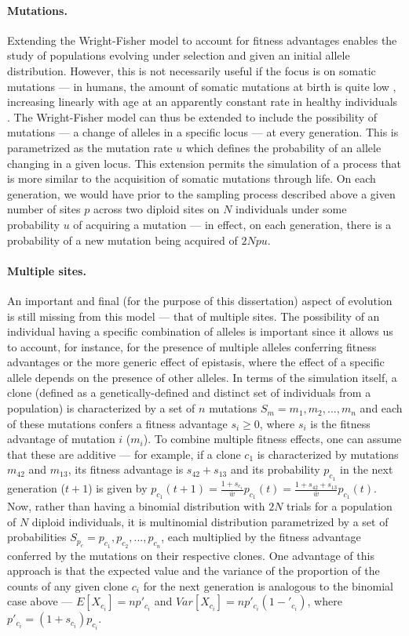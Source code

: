 \paragraph{Mutations.} Extending the Wright-Fisher model to account for fitness advantages enables the study of populations evolving under selection and given an initial allele distribution. However, this is not necessarily useful if the focus is on somatic mutations --- in humans, the amount of somatic mutations at birth is quite low \cite{SpencerChapman_2021_gjz4x4,Mitchell2021-zl}, increasing linearly with age at an apparently constant rate in healthy individuals \cite{Abascal_2021_gjvqfm,Mitchell2021-zl}. The Wright-Fisher model can thus be extended to include the possibility of mutations --- a change of alleles in a specific locus --- at every generation. This is parametrized as the mutation rate $u$ which defines the probability of an allele changing in a given locus. This extension permits the simulation of a process that is more similar to the acquisition of somatic mutations through life. On each generation, we would have prior to the sampling process described above a given number of sites $p$ across two diploid sites on $N$ individuals under some probability $u$ of acquiring a mutation --- in effect, on each generation, there is a probability of a new mutation being acquired of $2Npu$.
\paragraph{Multiple sites.} An important and final (for the purpose of this dissertation) aspect of evolution is still missing from this model --- that of multiple sites. The possibility of an individual having a specific combination of alleles is important since it allows us to account, for instance, for the presence of multiple alleles conferring fitness advantages or the more generic effect of epistasis, where the effect of a specific allele depends on the presence of other alleles. In terms of the simulation itself, a clone (defined as a genetically-defined and distinct set of individuals from a population) is characterized by a set of $n$ mutations $S_{m} = {m_1,m_2,...,m_n}$ and each of these mutations confers a fitness advantage $s_i \geq 0$, where $s_i$ is the fitness advantage of mutation $i$ ($m_i$). To combine multiple fitness effects, one can assume that these are additive --- for example, if a clone $c_1$ is characterized by mutations $m_{42}$ and $m_{13}$, its fitness advantage is $s_{42} + s_{13}$ and its probability $p_{c_1}$ in the next generation ($t+1$) is given by $p_{c_1}(t+1) = \frac{1+s_{c_1}}{\bar{w}}p_{c_1}(t) = \frac{1+s_{42}+s_{13}}{\bar{w}}p_{c_1}(t)$. Now, rather than having a binomial distribution with $2N$ trials for a population of $N$ diploid individuals, it is multinomial distribution parametrized by a set of probabilities $S_{p_c} = {p_{c_1},p_{c_2},...,p_{c_n}}$, each multiplied by the fitness advantage conferred by the mutations on their respective clones. One advantage of this approach is that the expected value and the variance of the proportion of the counts of any given clone $c_i$ for the next generation is analogous to the binomial case above --- $E[X_{c_i}] = np'_{c_i}$ and $Var[X_{c_i}] = np'_{c_i}(1-'_{c_i})$, where $p'_{c_i} = (1+s_{c_i})p_{c_i}$. 
